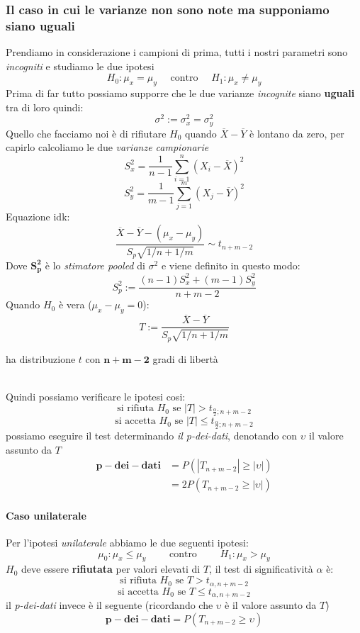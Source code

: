 \documentclass[]{article}
\begin{document}
    \subsubsection{Il caso in cui le varianze non sono note ma supponiamo siano uguali}
    Prendiamo in considerazione i campioni di prima, tutti i nostri parametri sono \textit{incogniti} e studiamo le due ipotesi
    \[ H_0 : \mu_x = \mu_y \quad \text{ contro } \quad H_1 : \mu_x \not = \mu_y \]
    Prima di far tutto possiamo supporre che le due varianze \textit{incognite} siano \textbf{uguali} tra di loro quindi:
    \[ \sigma^2 := \sigma^2_x = \sigma^2_y \]
    Quello che facciamo noi è di rifiutare $H_0$ quando $\overline{X} - \overline{Y}$ è lontano da zero, per capirlo calcoliamo le due \textit{varianze campionarie}
    \[ S^2_x = \frac{1}{n-1} \sum_{i=1}^{n} (X_i - \overline{X})^2 \]
    \[ S^2_y = \frac{1}{m-1} \sum_{j=1}^{m} (X_j - \overline{Y})^2 \]
    Equazione idk:
    \[ \frac{\overline{X} - \overline{Y} - (\mu_x - \mu_y)}{S_p \sqrt{1 / n + 1 / m}} \sim t_{n+m-2}\]
    Dove $\boldsymbol{S^2_p}$ è lo \textit{stimatore pooled} di $\sigma^2$ e viene definito in questo modo:
    \[ S^2_p := \frac{(n-1) S^2_x + (m-1) S^2_y}{n + m -2} \]
    Quando $H_0$ è vera ($\mu_x - \mu_y = 0$):
    \[ T := \frac{\overline{X} - \overline{Y}}{S_p \sqrt{1 / n + 1 /m}} \]
    \centerline{ha distribuzione $t$ con $\boldsymbol{n + m - 2}$ gradi di libertà} \\[2ex]
    Quindi possiamo verificare le ipotesi cosi:
    \[ \text{si rifiuta } H_0 \text{ se }  |T| > t_{\frac{\alpha}{2};n+m-2} \]
    \[ \text{si accetta } H_0 \text{ se }  |T| \leq t_{\frac{\alpha}{2};n+m-2} \]
    possiamo eseguire il test determinando \textit{il p-dei-dati}, denotando con $\upsilon$ il valore assunto da $T$
    \begin{equation*}
        \begin{split}
            \boldsymbol{p-dei-dati} &= P(|T_{n+m-2}| \geq |\upsilon|) \\
            &= 2P(T_{n+m-2} \geq |\upsilon|)
        \end{split}
    \end{equation*}
    \paragraph{Caso unilaterale}
    Per l'ipotesi \textit{unilaterale} abbiamo le due seguenti ipotesi:
    \[ \mu_0 : \mu_x \leq \mu_y \qquad \text{ contro } \qquad H_1 : \mu_x > \mu_y \]
    $H_0$ deve essere \textbf{rifiutata} per valori elevati di $T$, il test di significatività $\alpha$ è:
    \[ \text{si rifiuta } H_0 \text{ se }  T > t_{\alpha, n + m -2} \]
    \[ \text{si accetta } H_0 \text{ se }  T \leq t_{\alpha, n + m -2} \]
    il \textit{p-dei-dati} invece è il seguente (ricordando che $\upsilon$ è il valore assunto da $T$)
    \[ \boldsymbol{p-dei-dati} = P(T_{n+m-2} \geq \upsilon) \]
\end{document}
